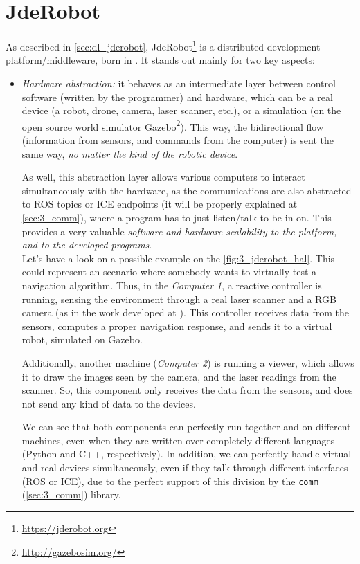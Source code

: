 \section{JdeRobot}
	As described in \autoref{sec:dl_jderobot}, JdeRobot\footnote{\url{https://jderobot.org}} is a distributed development platform/middleware, born in \cite{jmplaza-phd}. It stands out mainly for two key aspects:
	\begin{itemize}
		\item \textit{Hardware abstraction:} it behaves as an intermediate layer between control software (written by the programmer) and hardware, which can be a real device (a robot, drone, camera, laser scanner, etc.), or a simulation (on the open source world simulator Gazebo\footnote{\url{http://gazebosim.org/}}). This way, the bidirectional flow (information from sensors, and commands from the computer) is sent the same way, \textit{no matter the kind of the robotic device}.
		
		As well, this abstraction layer allows various computers to interact simultaneously with the hardware, as the communications are also abstracted to ROS topics or ICE endpoints (it will be properly explained at \autoref{sec:3_comm}), where a program has to just listen/talk to be in on. This provides a very valuable \textit{software and hardware scalability to the platform, and to the developed programs}.\\
		
		Let's have a look on a possible example on the \autoref{fig:3_jderobot_hal}. This could represent an scenario where somebody wants to virtually test a navigation algorithm. Thus, in the \emph{Computer 1}, a reactive controller is running, sensing the environment through a real laser scanner and a RGB camera (as in the work developed at \cite{rocapal}). This controller receives data from the sensors, computes a proper navigation response, and sends it to a virtual robot, simulated on Gazebo.
		
		Additionally, another machine (\emph{Computer 2}) is running a viewer, which allows it to draw the images seen by the camera, and the laser readings from the scanner. So, this component only receives the data from the sensors, and does not send any kind of data to the devices.
		
		We can see that both components can perfectly run together and on different machines, even when they are written over completely different languages (Python and C++, respectively). In addition, we can perfectly handle virtual and real devices simultaneously, even if they talk through different interfaces (ROS or ICE), due to the perfect support of this division by the \texttt{comm} (\autoref{sec:3_comm}) library.\\
		

\end{itemize}
